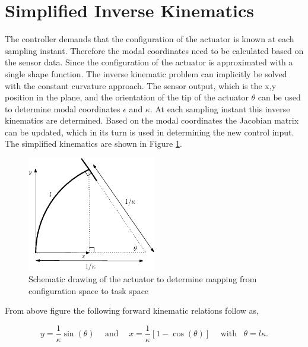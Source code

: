 \label{app4}





\section{Simplified Inverse Kinematics}

The controller demands that the configuration of the actuator is known at each sampling instant. Therefore the modal coordinates need to be calculated based on the sensor data. Since the configuration of the actuator is approximated with a single shape function. The inverse kinematic problem can implicitly be solved with the constant curvature approach. The sensor output, which is the x,y position in the plane, and the orientation of the tip of the actuator $\theta$ can be used to determine modal coordinates $\epsilon$ and $\kappa$. At each sampling instant this inverse kinematics are determined. Based on the modal coordinates the Jacobian matrix can be updated, which in its turn is used in determining the new control input. The simplified kinematics are shown in Figure \ref{fig:simpkin}.

\begin{figure}[H]
    \centering
    \includegraphics[width = 0.5\textwidth]{Figures/Chapter5/fbdkinematics.eps}
    \caption{Schematic drawing of the actuator to determine mapping from configuration space to task space}
    \label{fig:simpkin}
\end{figure}

From above figure the following forward kinematic relations follow as,


\begin{equation}
    y = \frac{1}{\kappa}\sin(\theta) \hspace{15pt} \text{and} \hspace{15pt}    x = \frac{1}{\kappa}[1-\cos(\theta)] \hspace{15pt} \text{with} \hspace{10pt}   \theta = l \kappa.
\end{equation}

